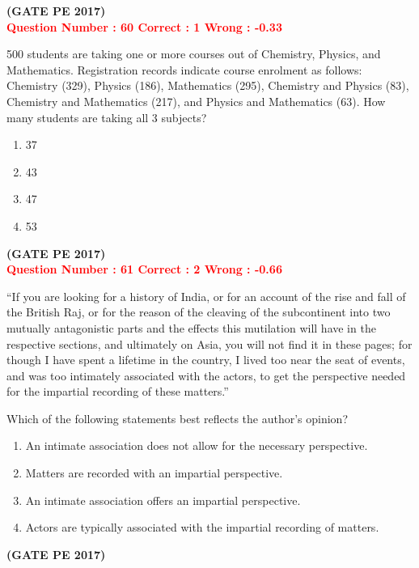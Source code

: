\documentclass[12pt]{article}
\begin{document}
{\hfill\textbf{(GATE PE 2017)}\\[0.6cm]


\textcolor{red}{\textbf{Question Number : 60 \hfill Correct : 1  Wrong : -0.33}}


500 students are taking one or more courses out of Chemistry, Physics, and Mathematics. Registration records indicate course enrolment as follows: Chemistry (329), Physics (186), Mathematics (295), Chemistry and Physics (83), Chemistry and Mathematics (217), and Physics and Mathematics (63). How many students are taking all 3 subjects?

\begin{enumerate}[label=(\Alph*)]
    \item 37
    \item 43
    \item 47
    \item 53
\end{enumerate}

\hfill\textbf{(GATE PE 2017)}\\[0.6cm]

\textcolor{red}{\textbf{Question Number : 61 \hfill Correct : 2  Wrong : -0.66}}


``If you are looking for a history of India, or for an account of the rise and fall of the British Raj, or for the reason of the cleaving of the subcontinent into two mutually antagonistic parts and the effects this mutilation will have in the respective sections, and ultimately on Asia, you will not find it in these pages; for though I have spent a lifetime in the country, I lived too near the seat of events, and was too intimately associated with the actors, to get the perspective needed for the impartial recording of these matters.''

Which of the following statements best reflects the author’s opinion?

\begin{enumerate}[label=(\Alph*)]
    \item An intimate association does not allow for the necessary perspective.
    \item Matters are recorded with an impartial perspective.
    \item An intimate association offers an impartial perspective.
    \item Actors are typically associated with the impartial recording of matters.
\end{enumerate}

\hfill\textbf{(GATE PE 2017)}\\[0.6cm]


}
\end{document}
